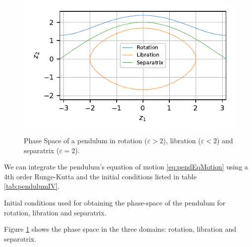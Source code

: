 \begin{figure}
    \centering
    \includegraphics{CodeAndFigures/PendulumPhaseSpace.pdf}
    \caption{Phase Space of a pendulum in rotation ($\varepsilon>2$), libration ($\varepsilon<2$) and separatrix ($\varepsilon=2$).}
    \label{fig:pendPhaseSpace}
\end{figure}

We can integrate the pendulum's equation of motion \ref{eq:pendEqMotion} using a 4th order Runge-Kutta and the initial conditions listed in table \ref{tab:pendulumIV}.

\begin{table}
    \centering
    
    \caption{Initial conditions used for obtaining the phase-space of the pendulum for rotation, libration and separatrix.}
    \label{tab:pendulumIV}
\end{table}

Figure \ref{fig:pendPhaseSpace} shows the phase space in the three domains: rotation, libration and separatrix.

